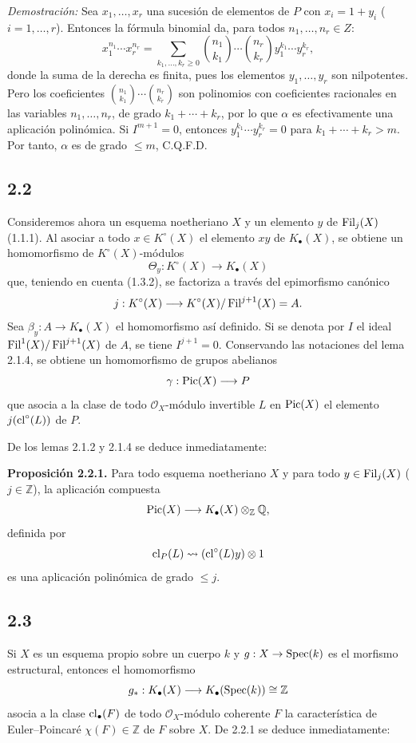 \emph{Demostración:} Sea $x_1,\ldots,x_r$ una sucesión de elementos de $P$
con $x_i=1+y_i$ ($i=1,\ldots,r$). Entonces la fórmula binomial da, para
todos $n_1,\ldots,n_r\in Z$:
\begin{equation}\tag{2.1.5}
x_1^{n_1}\cdots x_r^{n_r}=
\sum_{k_1,\ldots,k_r\geq0}\binom{n_1}{k_1}\cdots\binom{n_r}{k_r}
y_1^{k_1}\cdots y_r^{k_r},
\end{equation}
donde la suma de la derecha es finita, pues los elementos
$y_1,\ldots,y_r$ son nilpotentes. Pero los coeficientes
$\binom{n_1}{k_1}\cdots\binom{n_r}{k_r}$ son polinomios con coeficientes
racionales en las variables $n_1,\ldots,n_r$, de grado
$k_1+\cdots+k_r$, por lo que $\alpha$ es efectivamente una aplicación
polinómica. Si $I^{m+1}=0$, entonces
$y_1^{k_1}\cdots y_r^{k_r}=0$ para $k_1+\cdots+k_r>m$. Por tanto,
$\alpha$ es de grado $\leq m$, C.Q.F.D.

\subsection*{2.2}
Consideremos ahora un esquema noetheriano $X$ y un elemento $y$ de
$\Filt_j(X)$ (1.1.1). Al asociar a todo $x\in K^\circ(X)$ el elemento $xy$
de $K_\bullet(X)$, se obtiene un homomorfismo de $K^\circ(X)$-módulos
\[
\Theta_y:K^\circ(X)\longrightarrow K_\bullet(X)
\]
que, teniendo en cuenta (1.3.2), se factoriza a través del epimorfismo
canónico
\[
j:K^\circ(X)\longrightarrow K^\circ(X)/\Filt^{j+1}(X)=A.
\]
Sea $\beta_y:A\to K_\bullet(X)$ el homomorfismo así definido. Si se denota
por $I$ el ideal $\sisi{\Filt^j(X)}{\Filt^1(X)}/\Filt^{j+1}(X)$ de $A$, se tiene $I^{j+1}=0$.
Conservando las notaciones del lema 2.1.4, se obtiene un homomorfismo de
grupos abelianos
\[
\gamma:\Pic(X)\longrightarrow P
\]
que asocia a la clase de todo $\mathcal O_X$-módulo invertible $L$ en
$\Pic(X)$ el elemento $j(\cl^\circ(L))$ de $P$.

De los lemas 2.1.2 y 2.1.4 se deduce inmediatamente:

\textbf{Proposición 2.2.1.} Para todo esquema noetheriano $X$ y para todo
$y\in\Filt_j(X)$ ($j\in\mathbb Z$), la aplicación compuesta
\[
\Pic(X)\longrightarrow K_\bullet(X)\otimes_{\mathbb Z}\mathbb Q,
\]
definida por
\[
\cl_P(L)\rightsquigarrow (\cl^\circ(L)y)\otimes1
\]
es una aplicación polinómica de grado $\leq j$.

\subsection*{2.3}
Si $X$ es un esquema propio sobre un cuerpo $k$ y
$g:X\to\Spec(k)$ es el morfismo estructural, entonces el homomorfismo
\[
g_*:K_\bullet(X)\longrightarrow K_\bullet(\Spec(k))\cong\mathbb Z
\]
asocia a la clase $\cl_\bullet(F)$ de todo $\mathcal O_X$-módulo coherente
$F$ la característica de Euler--Poincaré $\chi(F)\in\mathbb Z$ de $F$
sobre $X$. De 2.2.1 se deduce inmediatamente:

